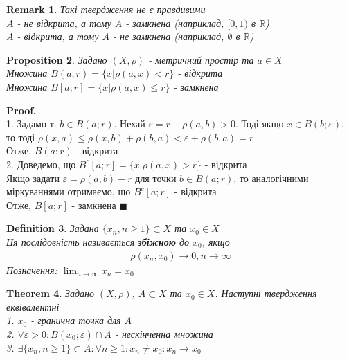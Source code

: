 \documentclass[a4paper, 14pt]{extarticle}
\def\huge{\displaystyle}
\theoremstyle{theoremdd}
\newtheorem{theorem}{Theorem}[subsection]
\theoremstyle{theoremdd}
\newtheorem{definition}[theorem]{Definition}
\theoremstyle{theoremdd}
\theoremstyle{theoremdd}
\theoremstyle{theoremdd}
\newtheorem{proposition}[theorem]{Proposition}
\theoremstyle{theoremdd}
\newtheorem{remark}[theorem]{Remark}
\theoremstyle{theoremdd}
\theoremstyle{theoremdd}
\newenvironment{pf}{\vspace*{-3mm} \textbf{Proof. \\}}{$\blacksquare$}
\begin{document}
\begin{remark} Такі твердження не є правдивими\\
$A$ - не відкрита, а тому $A$ - замкнена (наприклад, $[0,1)$ в $\mathbb{R}$)\\
$A$ - відкрита, а тому $A$ - не замкнена (наприклад, $\emptyset$ в $\mathbb{R}$)
\end{remark}

\begin{proposition} Задано $(X,\rho)$ - метричний простір та $a \in X$\\
Множина $B(a;r) = \{x | \rho(a,x) < r \}$ - відкрита\\
Множина $B[a;r] = \{x | \rho(a,x) \leq r \}$ - замкнена\\
\end{proposition}

\begin{pf}
1. Задамо т. $b \in B(a;r)$. Нехай $\varepsilon = r - \rho(a,b) > 0$. Тоді якщо $x \in B(b; \varepsilon)$, то тоді $\rho(x, a) \leq \rho(x, b) + \rho(b, a) < \varepsilon + \rho(b,a) = r$\\
Отже, $B(a;r)$ - відкрита
\bigskip \\
2. Доведемо, що $B^c[a;r] = \{x | \rho(a,x) > r\}$ - відкрита\\
Якщо задати $\varepsilon = \rho(a,b) - r$ для точки $b \in B(a;r)$, то аналогічними міркуваннями отримаємо, що $B^c[a;r]$ - відкрита\\
Отже, $B[a;r]$ - замкнена
\end{pf}

\begin{definition}
Задана $\{x_n, n \geq 1\} \subset X$ та $x_0 \in X$\\
Ця послідовність називається \textbf{збіжною} до $x_0$, якщо
\begin{align*}
\rho(x_n, x_0) \to 0, n \to \infty
\end{align*}
Позначення: $\huge\lim_{n \to \infty} x_n = x_0$
\end{definition}

\begin{theorem} Задано $(X,\rho)$, $A \subset X$ та $x_0 \in X$. Наступні твердження еквівалентні\\
1. $x_0$ - гранична точка для $A$\\
2. $\forall \varepsilon > 0: B(x_0;\varepsilon) \cap A$ - нескінченна множина\\
3. $\exists \{x_n, n \geq 1\} \subset A: \forall n \geq 1: x_n \neq x_0: x_n \to x_0$
\end{theorem}
\end{document}
